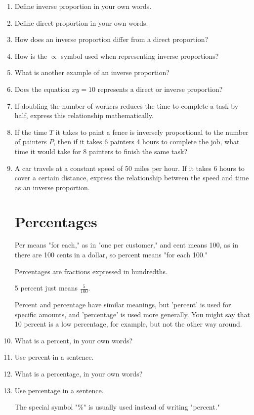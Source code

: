 \documentclass{article}
\begin{document}
\begin{spacing}{1.25}
\begin{enumerate}
\item Define inverse proportion in your own words.
\item Define direct proportion in your own words.
\item How does an inverse proportion differ from a direct proportion?
\item How is the $\propto$ symbol used when representing inverse proportions?
\item What is another example of an inverse proportion?
\item Does the equation $xy = 10$ represents a direct or inverse proportion?
\item If doubling the number of workers reduces the time to complete a task by half, express this relationship mathematically.
\item If the time $T$ it takes to paint a fence is inversely proportional to the number of painters $P$, then if it takes 6 painters 4 hours to complete the job, what time it would take for 8 painters to finish the same task?
\item A car travels at a constant speed of 50 miles per hour. If it takes 6 hours to cover a certain distance, express the relationship between the speed and time as an inverse proportion.

\section*{Percentages}

Per means "for each," as in "one per customer," and cent means 100, as in there are 100 cents in a dollar, so percent means "for each 100."

Percentages are fractions expressed in hundredths.

5 percent just means $\frac{5}{100}$.

Percent and percentage have similar meanings, but 'percent' is used for specific amounts, and 'percentage' is used more generally. You might say that 10 percent is a low percentage, for example, but not the other way around.

\item What is a percent, in your own words?
\item Use percent in a sentence.
\item What is a percentage, in your own words?
\item Use percentage in a sentence.

The special symbol "\%" is usually used instead of writing "percent."


\end{enumerate}
\end{spacing}
\end{document}
